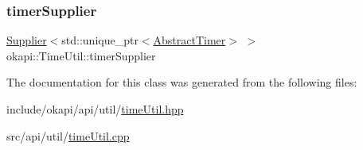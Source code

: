 \mbox{\label{classokapi_1_1TimeUtil_ac1d9f2cc535d5de97172645a3456e141}} 
\subsubsection{\texorpdfstring{timerSupplier}{timerSupplier}}
{\footnotesize\ttfamily \mbox{\hyperlink{classokapi_1_1Supplier}{Supplier}}$<$std\+::unique\+\_\+ptr$<$\mbox{\hyperlink{classokapi_1_1AbstractTimer}{Abstract\+Timer}}$>$ $>$ okapi\+::\+Time\+Util\+::timer\+Supplier\hspace{0.3cm}{\ttfamily [protected]}}



The documentation for this class was generated from the following files\+:\begin{DoxyCompactItemize}
\item 
include/okapi/api/util/\mbox{\hyperlink{timeUtil_8hpp}{time\+Util.\+hpp}}\item 
src/api/util/\mbox{\hyperlink{timeUtil_8cpp}{time\+Util.\+cpp}}\end{DoxyCompactItemize}
